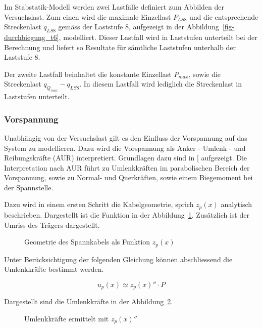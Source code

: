 \documentclass[
  11pt,
  letterpaper,
]{scrreprt}
\begin{document}
Im Stabstatik-Modell werden zwei Lastfälle definiert zum Abbilden der
Versuchslast. Zum einen wird die maximale Einzellast \(P_{LS8}\) und die
entsprechende Streckenlast \(q_{LS8}\) gemäss der Laststufe 8,
aufgezeigt in der Abbildung~\ref{fig-durchbiegung_t6}, modelliert.
Dieser Lastfall wird in Laststufen unterteilt bei der Berechnung und
liefert so Resultate für sämtliche Laststufen unterhalb der Laststufe 8.

Der zweite Lastfall beinhaltet die konstante Einzellast \(P_{max}\),
sowie die Streckenlast \(q_{Q_{max}} - q_{LS8}\). In diesem Lastfall
wird lediglich die Streckenlast in Laststufen unterteilt.

\subsubsection{Vorspannung}\label{vorspannung-1}

Unabhängig von der Versuchslast gilt es den Einfluss der Vorspannung auf
das System zu modellieren. Dazu wird die Vorspannung als Anker - Umlenk
- und Reibungskräfte (AUR) interpretiert. Grundlagen dazu sind in
{[}\citeproc{ref-thoma_vorspannung_2020}{6}{]} aufgezeigt. Die
Interpretation nach AUR führt zu Umlenkkräften im parabolischen Bereich
der Vorspannung, sowie zu Normal- und Querkräften, sowie einem
Biegemoment bei der Spannstelle.

Dazu wird in einem ersten Schritt die Kabelgeometrie, sprich \(z_p(x)\)
analytisch beschrieben. Dargestellt ist die Funktion in der
Abbildung~\ref{fig-z_p_von_x}. Zusätzlich ist der Umriss des Trägers
dargestellt.

\begin{figure}[H]


\caption{\label{fig-z_p_von_x}Geometrie des Spannkabels als Funktion
\(z_p(x)\)}

\end{figure}%

Unter Berücksichtigung der folgenden Gleichung können abschliessend die
Umlenkkräfte bestimmt werden.

\[
u_p(x) \simeq z_p(x)'' \cdot P
\]

Dargestellt sind die Umlenkkräfte in der Abbildung~\ref{fig-u_p_von_x}.

\begin{figure}[H]


\caption{\label{fig-u_p_von_x}Umlenkkräfte ermittelt mit \(z_p(x)''\)}

\end{figure}%
\end{document}
